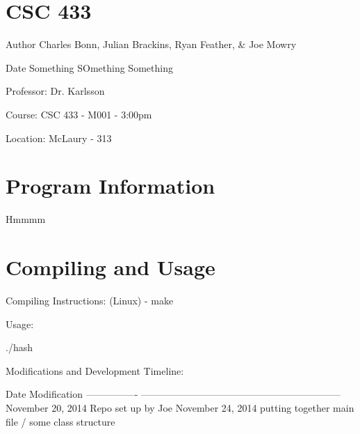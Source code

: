 \hypertarget{index_course_section}{}\section{C\-S\-C 433}\label{index_course_section}
\begin{DoxyAuthor}{Author}
Charles Bonn, Julian Brackins, Ryan Feather, \& Joe Mowry
\end{DoxyAuthor}
\begin{DoxyDate}{Date}
Something S\-Omething Something
\end{DoxyDate}
\begin{DoxyParagraph}{Professor\-:}
Dr. Karlsson
\end{DoxyParagraph}
\begin{DoxyParagraph}{Course\-:}
C\-S\-C 433 -\/ M001 -\/ 3\-:00pm
\end{DoxyParagraph}
\begin{DoxyParagraph}{Location\-:}
Mc\-Laury -\/ 313
\end{DoxyParagraph}
\hypertarget{index_program_section}{}\section{Program Information}\label{index_program_section}
Hmmmm\hypertarget{index_compile_section}{}\section{Compiling and Usage}\label{index_compile_section}
\begin{DoxyParagraph}{Compiling Instructions\-:}
(Linux) -\/ make
\end{DoxyParagraph}
\begin{DoxyParagraph}{Usage\-:}
\begin{DoxyVerb}./hash
\end{DoxyVerb}

\end{DoxyParagraph}
\begin{DoxyParagraph}{Modifications and Development Timeline\-:}
\begin{DoxyVerb}Date              Modification
----------------  --------------------------------------------------------------
November 20, 2014 Repo set up by Joe
November 24, 2014  putting together main file / some class structure
\end{DoxyVerb}
 
\end{DoxyParagraph}
